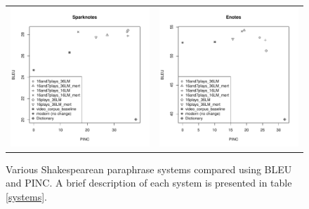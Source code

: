 \documentclass[10pt,a5paper,twoside]{article}
\begin{document}
\begin{figure}
  \begin{center}
    \begin{tabular}{cc}
      \includegraphics[width=2.4in]{figures/bleupinc1.pdf} & \includegraphics[width=2.4in]{figures/bleupinc2.pdf} \\
    \end{tabular}
  \end{center}
  \caption{Various Shakespearean paraphrase systems compared using BLEU and PINC.  A brief description of each system is presented in table \ref{systems}.}
  \label{bleupinc}
\end{figure}
\end{document}
